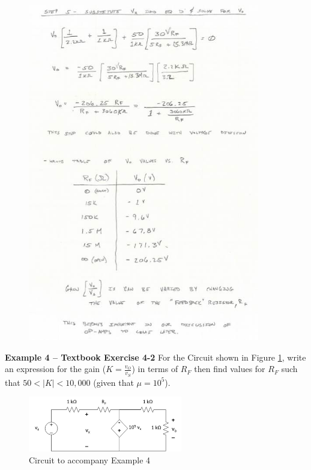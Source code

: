 \documentclass{handout}
\begin{document}
{\newpage
\clearpage
\pagebreak

\begin{figure}[h! t! b!]
\centering
\includegraphics[width=0.9\textwidth]{Example3solnC.jpg}
\end{figure}

}
\newpage
\clearpage
\pagebreak

\textbf{Example 4 -- Textbook Exercise 4-2}
For the Circuit shown in Figure \ref{fig: Example4}, write an expression for the gain ($K=\frac{v_O}{v_S}$) in terms of $R_F$ then find values for $R_F$ such that $50<|K|<10,000$ (given that $\mu=10^5$).
\begin{figure}[h! t! b!]
\centering
\includegraphics[width=0.6\textwidth]{Example4.jpg}
\caption{Circuit to accompany Example 4}
\label{fig: Example4}
\end{figure}
\end{document}
